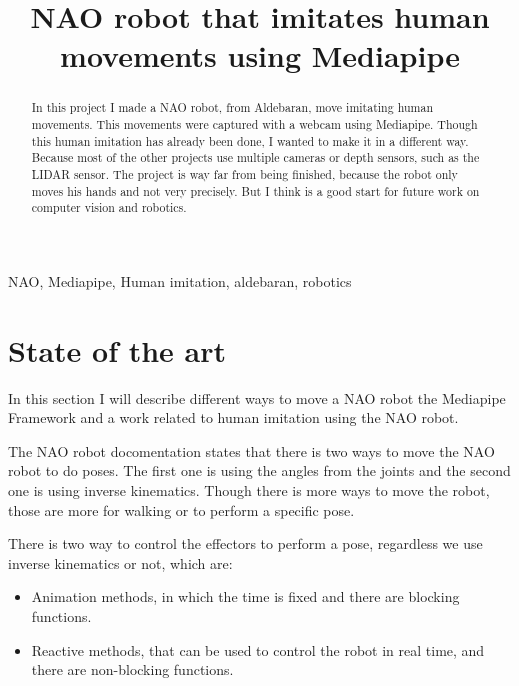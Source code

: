 \documentclass[conference]{IEEEtran}
\begin{document}
\title{NAO robot that imitates human movements using Mediapipe\\

}

\author{
}

\maketitle

\begin{abstract}

    In this project I made a NAO robot, from Aldebaran, move imitating human movements. This movements were captured with a webcam using Mediapipe.
    Though this human imitation has already been done, I wanted to make it in a different way. Because most of the other projects use multiple cameras or depth sensors, such as the LIDAR sensor. 
    The project is way far from being finished, because the robot only moves his hands and not very precisely. But I think is a good start for future work on computer vision and robotics.
\end{abstract}

\begin{IEEEkeywords}
NAO, Mediapipe, Human imitation, aldebaran, robotics
\end{IEEEkeywords}
\section{State of the art}
In this section I will describe different ways to move a NAO robot the Mediapipe Framework and a work related to human imitation using the NAO robot.
 
The NAO robot docomentation  \cite{b7} states that there is two ways to move the NAO robot to do poses. The first one is using the angles from the joints and the second one is using inverse kinematics. Though there is more ways to move the robot, those are more for walking or to perform a specific pose.

There is  two way to control the effectors to perform a pose, regardless we use inverse kinematics or not, which are:
\begin{itemize}
    \item Animation methods, in which the time is fixed and there are blocking functions.
    \item Reactive methods, that can be used to control the robot in real time, and there are non-blocking functions.
\end{itemize}
\end{document}
